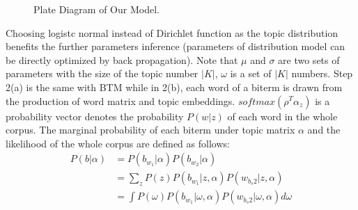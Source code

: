 \begin{figure}[!htp]
    \centering
    \caption{Plate Diagram of Our Model.}
    \label{fig:nbtm}
\end{figure}
Choosing logistc normal instead of Dirichlet function as the topic distribution benefits the further parameters inference (parameters of distribution model can be directly optimized by back propagation). Note that $\mu$ and $\sigma$ are two sets of parameters with the size of the topic number $|K|$, $\omega$ is a set of $|K|$ numbers. Step 2(a) is the same with BTM while in 2(b), each word of a biterm is drawn from the production of word matrix and topic embeddings. $softmax(\rho^T\alpha_z)$ is a probability vector denotes the probability $P(w|z)$ of each word in the whole corpus. The marginal probability of each biterm under topic matrix $\alpha$ and the likelihood of the whole corpus are defined as follows:
\begin{equation}
    \begin{aligned}
        P(b|\alpha) & = P(b_{w_1}|\alpha)P(b_{w_2}|\alpha)\\
        & = \sum_zP(z)P(b_{w_1}|z,\alpha)P(w_{b_s2}|z,\alpha) \\
        & = \int P(\omega)P(b_{w_1}|\omega,\alpha)P(w_{b_s2}|\omega,\alpha) d\omega 
    \end{aligned}
    \label{eq:biterm}
\end{equation}
